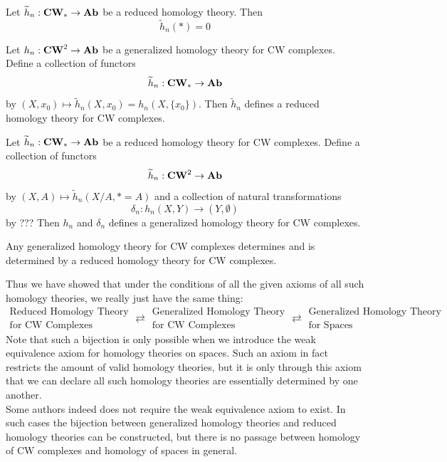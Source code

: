 \documentclass[a4paper]{article}
\begin{document}
\begin{lmm}{}{} Let $\widetilde{h}_n:\bold{CW}_\ast\to\bold{Ab}$ be a reduced homology theory. Then $$\widetilde{h}_n(\ast)=0$$
\end{lmm}

\begin{prp}{}{} Let $h_n:\bold{CW}^2\to\bold{Ab}$ be a generalized homology theory for CW complexes. Define a collection of functors $$\widetilde{h}_n:\bold{CW}_\ast\to\bold{Ab}$$ by $(X,x_0)\mapsto\widetilde{h}_n(X,x_0)=h_n(X,\{x_0\})$. Then  $\widetilde{h}_n$ defines a reduced homology theory for CW complexes. 
\end{prp}

\begin{prp}{}{} Let $\widetilde{h}_n:\bold{CW}_\ast\to\bold{Ab}$ be a reduced homology theory for CW complexes. Define a collection of functors $$\widetilde{h}_n:\bold{CW}^2\to\bold{Ab}$$ by $(X,A)\mapsto\widetilde{h}_n(X/A,\ast=A)$ and a collection of natural transformations $$\delta_n:h_n(X,Y)\to(Y,\emptyset)$$ by ??? Then $h_n$ and $\delta_n$ defines a generalized homology theory for CW complexes. 
\end{prp}

\begin{prp}{}{} Any generalized homology theory for CW complexes determines and is determined by a reduced homology theory for CW complexes. 
\end{prp}

Thus we have showed that under the conditions of all the given axioms of all such homology theories, we really just have the same thing: $$\substack{\text{Reduced Homology Theory}\\\text{for CW Complexes}}\rightleftarrows\substack{\text{Generalized Homology Theory}\\\text{for CW Complexes}}\rightleftarrows\substack{\text{Generalized Homology Theory}\\\text{for Spaces}}$$ Note that such a bijection is only possible when we introduce the weak equivalence axiom for homology theories on spaces. Such an axiom in fact restricts the amount of valid homology theories, but it is only through this axiom that we can declare all such homology theories are essentially determined by one another. \\

Some authors indeed does not require the weak equivalence axiom to exist. In such cases the bijection between generalized homology theories and reduced homology theories can be constructed, but there is no passage between homology of CW complexes and homology of spaces in general. 
\end{document}
